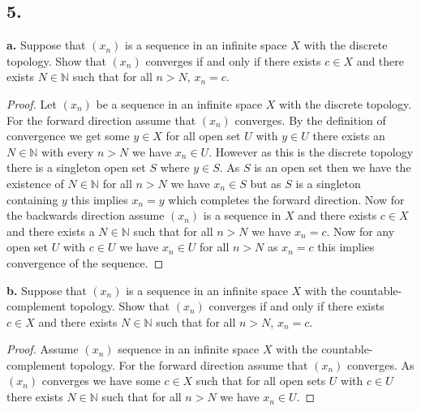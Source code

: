 \documentclass{amsart}
\theoremstyle{plain}
\theoremstyle{definition}
\theoremstyle{remark}
\begin{document}
\vspace{.15in}

\noindent
\subsection*{5.}

{\bfseries a.} Suppose that $(x_n)$ is a sequence in an infinite space $X$ with the discrete topology. Show that $(x_n)$ converges if and only if there exists $c\in X$ and there exists $N\in \mathbb N$ such that for all $n > N$, $x_n = c$.

\begin{proof}
    Let $(x_n)$ be a sequence in an infinite space $X$ with the discrete topology. 
    For the forward direction assume that $(x_n)$ converges. By the definition of convergence we get some $y\in X$ for all open set $U$ with $y\in U$ there exists an $N\in \mathbb{N}$ with every $n>N$ we have $x_n\in U$. However as this is the discrete topology there is a singleton open set  $S$ where $y\in S$. As $S$ is an open set then we have the existence of $N\in \mathbb{N}$ for all $n>N$ we have $x_n\in S$ but as $S$ is a singleton containing $y$ this implies $x_n=y$ which completes the forward direction. 
    Now for the backwards direction assume $(x_n)$ is a sequence in $X$ and there exists $c\in X$ and there exists a $N\in \mathbb{N}$ such that for all $n>N$ we have $x_n=c$. Now for any open set $U$ with $c\in U$ we have $x_n\in U$ for all $n>N$ as $x_n=c$ this implies convergence of the sequence.


\end{proof}

\vspace{.1in}
{\bfseries b.} Suppose that $(x_n)$ is a sequence in an infinite space $X$ with the countable-complement topology. Show that $(x_n)$ converges if and only if there exists $c\in X$ and there exists $N\in \mathbb N$ such that for all $n > N$, $x_n = c$.

\begin{proof}
    Assume $(x_n)$ sequence in an infinite space $X$ with the countable-complement topology. For the forward direction assume that $(x_n)$ converges. As $(x_n)$ converges we have some $c\in X$ such that for all open sets $U$ with $c\in U$ there exists $N\in \mathbb{N}$ such that for all $n>N$ we have $x_n\in U$.
\end{proof}
\end{document}
